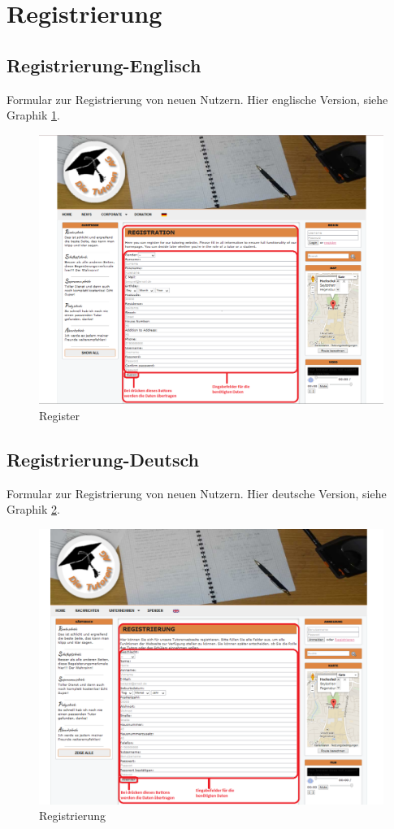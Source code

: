 
\section{Registrierung}

\subsection{Registrierung-Englisch}
Formular zur Registrierung von neuen Nutzern. 
Hier englische Version, siehe Graphik \ref{fig:RegisterEn}.


\begin{figure}[!htbp]
 \centering
 \includegraphics[width=1\textwidth]{../Screenshots/en/Register}
 \caption{Register}
 \label{fig:RegisterEn}
\end{figure}

\newpage

\subsection{Registrierung-Deutsch}

Formular zur Registrierung von neuen Nutzern. 
Hier deutsche Version, siehe Graphik \ref{fig:RegisterDe}.


\begin{figure}[!htbp]
 \centering
 \includegraphics[width=1\textwidth]{../Screenshots/de/Registrierung}
 \caption{Registrierung}
 \label{fig:RegisterDe}
\end{figure}